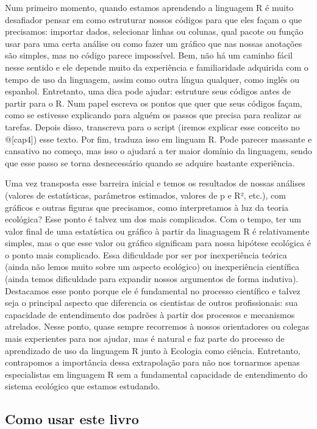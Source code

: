 \documentclass[
]{article}
\begin{document}
Num primeiro momento, quando estamos aprendendo a linguagem R é muito desafiador pensar em como estruturar nossos códigos para que eles façam o que precisamos: importar dados, selecionar linhas ou colunas, qual pacote ou função usar para uma certa análise ou como fazer um gráfico que nas nossas anotações são simples, mas no código parece impossível. Bem, não há um caminho fácil nesse sentido e ele depende muito da experiência e familiaridade adquirida com o tempo de uso da linguagem, assim como outra língua qualquer, como inglês ou espanhol. Entretanto, uma dica pode ajudar: estruture seus códigos antes de partir para o R. Num papel escreva os pontos que quer que seus códigos façam, como se estivesse explicando para alguém os passos que precisa para realizar as tarefas. Depois disso, transcreva para o script (iremos explicar esse conceito no @{[}cap4{]}) esse texto. Por fim, traduza isso em linguam R. Pode parecer massante e cansativo no começo, mas isso o ajudará a ter maior domínio da linguagem, sendo que esse passo se torna desnecessário quando se adquire bastante experiência.

Uma vez transposta esse barreira inicial e temos os resultados de nossas análises (valores de estatísticas, parâmetros estimados, valores de p e R², etc.), com gráficos e outras figuras que precisamos, como interpretamos à luz da teoria ecológica? Esse ponto é talvez um dos mais complicados. Com o tempo, ter um valor final de uma estatística ou gráfico à partir da linaguagem R é relativamente simples, mas o que esse valor ou gráfico significam para nossa hipótese ecológica é o ponto mais complicado. Essa dificuldade por ser por inexperiência teórica (ainda não lemos muito sobre um aspecto ecológico) ou inexperiência científica (ainda temos dificuldade para expandir nossos argumentos de forma indutiva). Destacamos esse ponto porque ele é fundamental no processo científico e talvez seja o principal aspecto que diferencia os cientistas de outros profissionais: sua capacidade de entendimento dos padrões à partir dos processos e mecanismos atrelados. Nesse ponto, quase sempre recorremos à nossos orientadores ou colegas mais experientes para nos ajudar, mas é natural e faz parte do processo de aprendizado de uso da linguagem R junto à Ecologia como ciência. Entretanto, contrapomos a importância dessa extrapolação para não nos tornarmos apenas especialistas em linguagem R sem a fundamental capacidade de entendimento do sistema ecológico que estamos estudando.

\hypertarget{como-usar-este-livro}{%
\subsection{Como usar este livro}\label{como-usar-este-livro}}
\end{document}
